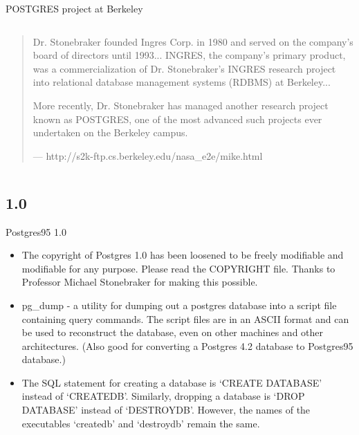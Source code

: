 \documentclass[t,10pt]{beamer}
\begin{document}
\begin{frame}[label=testing]{POSTGRES project at Berkeley}
\begin{columns}[T]
\begin{column}{0.7\textwidth}
\begin{quotation}
        Dr. Stonebraker founded Ingres Corp. in 1980 and served on the
        company's board of directors until 1993... INGRES, the company's
        primary product, was a commercialization of Dr. Stonebraker's INGRES
        research project into relational database management systems (RDBMS)
        at Berkeley...

        \alert<2>{
          More recently, Dr. Stonebraker has managed another research project
          known as POSTGRES, one of the most advanced such projects ever
          undertaken on the Berkeley campus.
        }

        \tiny--- http://s2k-ftp.cs.berkeley.edu/nasa\_e2e/mike.html
      \end{quotation}
    \end{column}
  \end{columns}
\end{frame}

\subsection{1.0}
\begin{frame}{Postgres95 1.0}
  \begin{itemize}%
  \item \alert<2>{The copyright of Postgres 1.0 has been loosened to
    be freely modifiable and modifiable for any purpose.  Please read
    the COPYRIGHT file.  Thanks to Professor Michael Stonebraker for
    making this possible.}
  \item pg\_dump - a utility for dumping out a postgres database into
    a script file containing query commands. The script files are in
    an ASCII format and can be used to reconstruct the database, even
    on other machines and other architectures. (Also good for
    converting a Postgres 4.2 database to Postgres95 database.)
  \item The SQL statement for creating a database is `CREATE DATABASE' instead
    of `CREATEDB'. Similarly, dropping a database is `DROP DATABASE' instead
    of `DESTROYDB'. However, the names of the executables `createdb' and
    `destroydb' remain the same.
  \end{itemize}
\end{frame}
\end{document}
